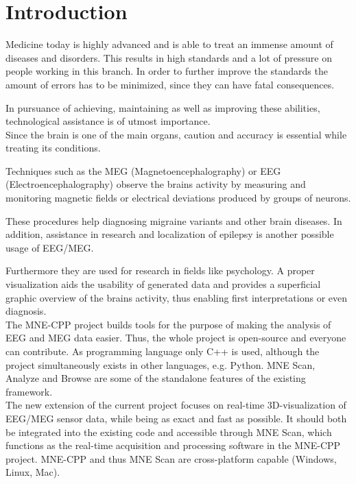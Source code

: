 
\section{Introduction}

	Medicine today is highly advanced and is able to treat an immense amount of diseases and disorders.
	This results in high standards and a lot of pressure on people working in this branch. In order to further improve the 			standards the amount of errors has to be minimized, since they can have fatal consequences. %

	In pursuance of achieving, maintaining as well as improving these abilities, technological assistance is of utmost 				importance.\\  

	Since the brain is one of the main organs, caution and accuracy is essential while treating its conditions. 
	
	Techniques such as the MEG (Magnetoencephalography) or EEG (Electroencephalography) observe the brains activity by 				measuring and monitoring magnetic fields or electrical deviations produced by groups of neurons.

	These procedures help diagnosing migraine variants and other brain diseases. In addition, assistance in 				research and localization of epilepsy is another possible usage of EEG/MEG. 
	 
	Furthermore they are used for research in fields like psychology.
	A proper visualization aids the usability of generated data and provides a superficial graphic overview of the brains 			activity, thus enabling first interpretations or even diagnosis.\\
	

	The MNE-CPP  project builds tools for the purpose of making the analysis of EEG and MEG data easier.
	Thus, the whole project is open-source and everyone can contribute. As programming language only C++ is used, although the 	project simultaneously exists in other languages, e.g. Python. 
	MNE Scan, Analyze and Browse are some of the standalone features of the existing framework. \\

	The new extension of the current project focuses on real-time 3D-visualization of EEG/MEG sensor data, while being as 			exact and fast as possible. It should both be integrated into the existing code and accessible through MNE Scan, which 			functions as the real-time acquisition and processing software in the MNE-CPP project. MNE-CPP and thus MNE Scan are 			cross-platform capable (Windows, Linux, Mac). 
  

